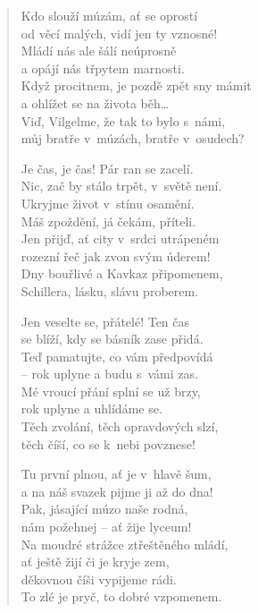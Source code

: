 \begin{verse}
\medskip

Kdo slouží múzám, ať se oprostí\\
od věcí malých, vidí jen ty vznosné!\\
Mládí nás ale šálí neúprosně\\
a opájí nás třpytem marnosti.\\
Když procitnem, je pozdě zpět sny mámit\\
a ohlížet se na života běh\ldots\\
Viď, Vilgelme, že tak to bylo s~námi,\\
můj bratře v~múzách, bratře v~osudech?

\medskip

Je čas, je čas! Pár ran se zacelí.\\
Nic, zač by stálo trpět, v~světě není.\\
Ukryjme život v~stínu osamění.\\
Máš zpoždění, já čekám, příteli.\\
Jen přijď, ať city v~srdci utrápeném\\
rozezní řeč jak zvon svým úderem!\\
Dny bouřlivé a Kavkaz připomenem,\\
Schillera, lásku, slávu proberem.

\bigskip

Jen veselte se, přátelé! Ten čas\\
se blíží, kdy se básník zase přidá.\\
Teď pamatujte, co vám předpovídá\\
-- rok uplyne a budu s~vámi zas.\\
Mé vroucí přání splní se už brzy,\\
rok uplyne a uhlídáme se.\\
Těch zvolání, těch opravdových slzí,\\
těch číší, co se k~nebi povznese!

\medskip

Tu první plnou, ať je v~hlavě šum,\\
a na náš svazek pijme ji až do dna!\\
Pak, jásající múzo naše rodná,\\
nám požehnej -- ať žije lyceum!\\
Na moudré strážce ztřeštěného mládí,\\
ať ještě žijí či je kryje zem,\\
děkovnou číši vypijeme rádi.\\
To zlé je pryč, to dobré vzpomenem.


\end{verse}
